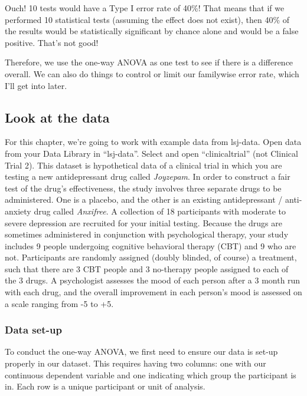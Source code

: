 \documentclass[
]{book}
\begin{document}
Ouch! 10 tests would have a Type I error rate of 40\%! That means that if we performed 10 statistical tests (assuming the effect does not exist), then 40\% of the results would be statistically significant by chance alone and would be a false positive. That's not good!

Therefore, we use the one-way ANOVA as one test to see if there is a difference overall. We can also do things to control or limit our familywise error rate, which I'll get into later.

\hypertarget{look-at-the-data-6}{%
\subsection{Look at the data}\label{look-at-the-data-6}}

For this chapter, we're going to work with example data from lsj-data. Open data from your Data Library in ``lsj-data''. Select and open ``clinicaltrial'' (not Clinical Trial 2). This dataset is hypothetical data of a clinical trial in which you are testing a new antidepressant drug called \emph{Joyzepam}. In order to construct a fair test of the drug's effectiveness, the study involves three separate drugs to be administered. One is a placebo, and the other is an existing antidepressant / anti-anxiety drug called \emph{Anxifree}. A collection of 18 participants with moderate to severe depression are recruited for your initial testing. Because the drugs are sometimes administered in conjunction with psychological therapy, your study includes 9 people undergoing cognitive behavioral therapy (CBT) and 9 who are not. Participants are randomly assigned (doubly blinded, of course) a treatment, such that there are 3 CBT people and 3 no-therapy people assigned to each of the 3 drugs. A psychologist assesses the mood of each person after a 3 month run with each drug, and the overall improvement in each person's mood is assessed on a scale ranging from -5 to +5.

\hypertarget{data-set-up-6}{%
\subsubsection{Data set-up}\label{data-set-up-6}}

To conduct the one-way ANOVA, we first need to ensure our data is set-up properly in our dataset. This requires having two columns: one with our continuous dependent variable and one indicating which group the participant is in. Each row is a unique participant or unit of analysis.
\end{document}
